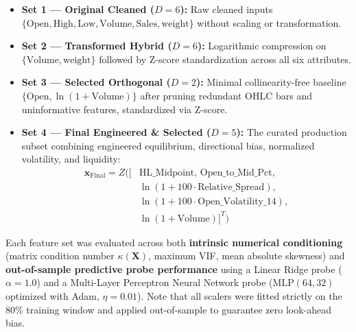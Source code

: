 \documentclass[conference]{IEEEtran}
\begin{document}
\begin{itemize}
    \item \textbf{Set 1 --- Original Cleaned ($D = 6$):} Raw cleaned inputs $\{\text{Open}, \text{High}, \text{Low}, \text{Volume}, \text{Sales}, \text{weight}\}$ without scaling or transformation.
    \item \textbf{Set 2 --- Transformed Hybrid ($D = 6$):} Logarithmic compression on $\{\text{Volume}, \text{weight}\}$ followed by Z-score standardization across all six attributes.
    \item \textbf{Set 3 --- Selected Orthogonal ($D = 2$):} Minimal collinearity-free baseline $\{\text{Open}, \ln(1+\text{Volume})\}$ after pruning redundant OHLC bars and uninformative features, standardized via Z-score.
    \item \textbf{Set 4 --- Final Engineered \& Selected ($D = 5$):} The curated production subset combining engineered equilibrium, directional bias, normalized volatility, and liquidity:
    \begin{equation}
    \begin{split}
        \mathbf{x}_{\text{Final}} = Z\Big(\big[ & \text{HL\_Midpoint},\, \text{Open\_to\_Mid\_Pct}, \\
        & \ln(1 + 100\cdot\text{Relative\_Spread}), \\
        & \ln(1 + 100\cdot\text{Open\_Volatility\_14}), \\
        & \ln(1 + \text{Volume}) \big]^T\Big)
    \end{split}
    \end{equation}
\end{itemize}

Each feature set was evaluated across both \textbf{intrinsic numerical conditioning} (matrix condition number $\kappa(\mathbf{X})$, maximum VIF, mean absolute skewness) and \textbf{out-of-sample predictive probe performance} using a Linear Ridge probe ($\alpha = 1.0$) and a Multi-Layer Perceptron Neural Network probe ($\text{MLP}(64, 32)$ optimized with Adam, $\eta = 0.01$). Note that all scalers were fitted strictly on the $80\%$ training window and applied out-of-sample to guarantee zero look-ahead bias.
\end{document}
